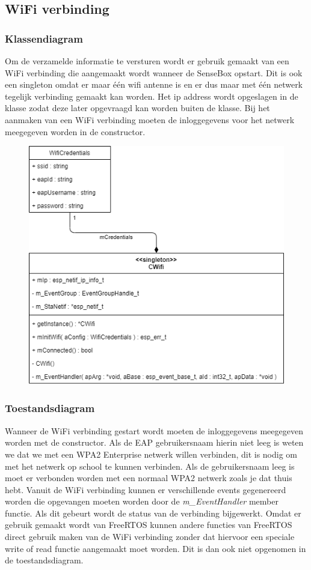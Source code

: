 \newpage
\subsection{WiFi verbinding}
\subsubsection{Klassendiagram}
Om de verzamelde informatie te versturen wordt er gebruik gemaakt van een WiFi verbinding die aangemaakt wordt wanneer de SenseBox opstart. Dit is ook een singleton omdat er maar één wifi antenne is en er dus maar met één netwerk tegelijk verbinding gemaakt kan worden. Het ip address wordt opgeslagen in de klasse zodat deze later opgevraagd kan worden buiten de klasse. Bij het aanmaken van een WiFi verbinding moeten de inloggegevens voor het netwerk meegegeven worden in de constructor.

\begin{figure}[H]
  \centering
  \includegraphics[width=.6\columnwidth]{uml/wifi-network-stack.png}
\end{figure}

\newpage
\subsubsection{Toestandsdiagram}
Wanneer de WiFi verbinding gestart wordt moeten de inloggegevens meegegeven worden met de constructor. Als de EAP gebruikersnaam hierin niet leeg is weten we dat we met een WPA2 Enterprise netwerk willen verbinden, dit is nodig om met het netwerk op school te kunnen verbinden. Als de gebruikersnaam leeg is moet er verbonden worden met een normaal WPA2 netwerk zoals je dat thuis hebt. Vanuit de WiFi verbinding kunnen er verschillende events gegenereerd worden die opgevangen moeten worden door de \emph{m\_EventHandler} member functie. Als dit gebeurt wordt de status van de verbinding bijgewerkt.
\vspace{1em}
Omdat er gebruik gemaakt wordt van FreeRTOS kunnen andere functies van FreeRTOS direct gebruik maken van de WiFi verbinding zonder dat hiervoor een speciale write of read functie aangemaakt moet worden. Dit is dan ook niet opgenomen in de toestandsdiagram.

